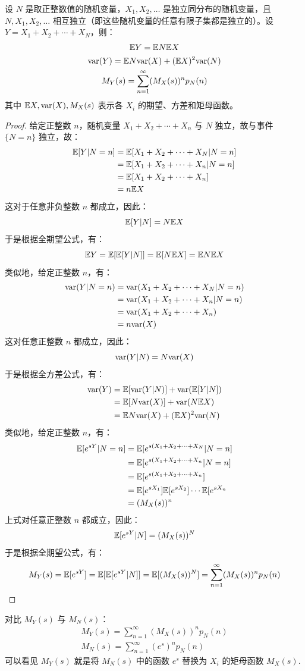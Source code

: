 \begin{theorem}
设 $N$ 是取正整数值的随机变量，$X_1,X_2,\ldots$ 是独立同分布的随机变量，且 $N,X_1,X_2,\ldots$ 相互独立（即这些随机变量的任意有限子集都是独立的）。设 $Y=X_1+X_2+\cdots+X_N$，则：
\begin{gather*}
    \mathbb{E} Y=\mathbb{E} N\mathbb{E} X\\
    \mathrm{var}(Y)=\mathbb{E} N\mathrm{var}(X)+(\mathbb{E} X)^2\mathrm{var}(N)\\
    M_Y(s)=\sum_{n=1}^\infty (M_X(s))^n p_N(n)
\end{gather*}
其中 $\mathbb{E} X,\mathrm{var}(X),M_X(s)$ 表示各 $X_i$ 的期望、方差和矩母函数。
\end{theorem}
\begin{proof}
给定正整数 $n$，随机变量 $X_1+X_2+\cdots+X_n$ 与 $N$ 独立，故与事件 $\{N=n\}$ 独立，故：
\begin{align*}
\mathbb{E}[Y\vert N=n]&=\mathbb{E}[X_1+X_2+\cdots+X_N\vert N=n]\\
&=\mathbb{E}[X_1+X_2+\cdots+X_n\vert N=n]\\
&=\mathbb{E}[X_1+X_2+\cdots+X_n]\\
&=n\mathbb{E} X
\end{align*}
这对于任意非负整数 $n$ 都成立，因此：
\[
\mathbb{E}[Y\vert N]=N\mathbb{E} X
\]
于是根据全期望公式，有：
\[
\mathbb{E} Y=\mathbb{E}[\mathbb{E}[Y\vert N]]=\mathbb{E}[N\mathbb{E} X]=\mathbb{E} N\mathbb{E} X
\]
类似地，给定正整数 $n$，有：
\begin{align*}
\mathrm{var}(Y\vert N=n)&=\mathrm{var}(X_1+X_2+\cdots+X_N\vert N=n)\\
&=\mathrm{var}(X_1+X_2+\cdots+X_n\vert N=n)\\
&=\mathrm{var}(X_1+X_2+\cdots+X_n)\\
&=n\mathrm{var}(X)
\end{align*}
这对任意正整数 $n$ 都成立，因此：
\[
\mathrm{var}(Y\vert N)=N\mathrm{var}(X)
\]
于是根据全方差公式，有：
\begin{align*}
\mathrm{var}(Y)&=\mathbb{E}[\mathrm{var}(Y\vert N)]+\mathrm{var}(\mathbb{E}[Y\vert N])\\
&=\mathbb{E}[N\mathrm{var}(X)]+\mathrm{var}(N\mathbb{E} X)\\
&=\mathbb{E} N\mathrm{var}(X)+(\mathbb{E} X)^2\mathrm{var}(N)
\end{align*}
类似地，给定正整数 $n$，有：
\begin{align*}
\mathbb{E}[e^{sY}\vert N=n]&=\mathbb{E}[e^{s(X_1+X_2+\cdots+X_N}\vert N=n]\\
&=\mathbb{E}[e^{s(X_1+X_2+\cdots+X_n}\vert N=n]\\
&=\mathbb{E}[e^{s(X_1+X_2+\cdots+X_n}]\\
&=\mathbb{E}[e^{sX_1}]\mathbb{E}[e^{sX_2}]\cdots\mathbb{E}[e^{sX_n}\\
&=(M_{X}(s))^n
\end{align*}
上式对任意正整数 $n$ 都成立，因此：
\[
\mathbb{E}[e^{sY}\vert N]=(M_X(s))^N
\]
于是根据全期望公式，有：
\[
M_Y(s)=\mathbb{E}[e^{sY}]=\mathbb{E}[\mathbb{E}[e^{sY}\vert N]]=\mathbb{E}[(M_X(s))^N]=\sum_{n=1}^\infty (M_X(s))^n p_N(n)
\]
\end{proof}

\begin{com}
对比 $M_Y(s)$ 与 $M_N(s)$：
\begin{gather*}
    M_Y(s)=\sum_{n=1}^\infty (M_X(s))^n p_N(n)\\
    M_N(s)=\sum_{n=1}^\infty (e^s)^np_N(n)
\end{gather*}
可以看见 $M_Y(s)$ 就是将 $M_N(s)$ 中的函数 $e^s$ 替换为 $X_i$ 的矩母函数 $M_X(s)$.
\end{com}
